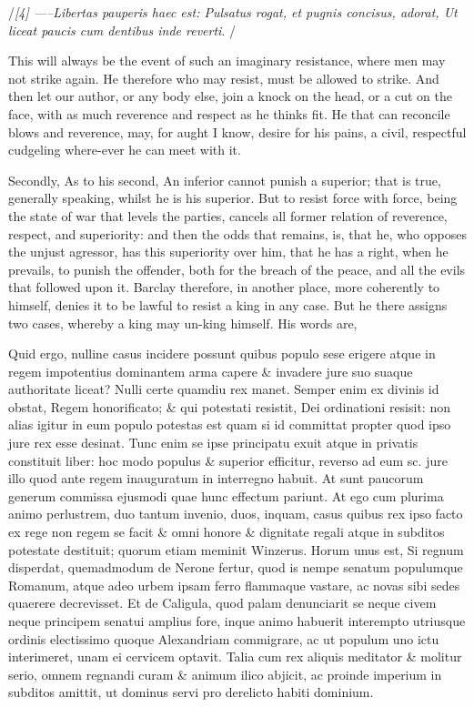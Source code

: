 \documentclass[11pt,openany]{book}
\begin{document}
/\emph{[4] -----Libertas pauperis haec est: Pulsatus rogat, et pugnis concisus, adorat, Ut liceat paucis cum dentibus inde reverti}. /

This will always be the event of such an imaginary resistance, where men may not strike again. He therefore who may resist, must be allowed to strike. And then let our author, or any body else, join a knock on the head, or a cut on the face, with as much reverence and respect as he thinks fit. He that can reconcile blows and reverence, may, for aught I know, desire for his pains, a civil, respectful cudgeling where-ever he can meet with it.

Secondly, As to his second, An inferior cannot punish a superior; that is true, generally speaking, whilst he is his superior. But to resist force with force, being the state of war that levels the parties, cancels all former relation of reverence, respect, and superiority: and then the odds that remains, is, that he, who opposes the unjust agressor, has this superiority over him, that he has a right, when he prevails, to punish the offender, both for the breach of the peace, and all the evils that followed upon it. Barclay therefore, in another place, more coherently to himself, denies it to be lawful to resist a king in any case. But he there assigns two cases, whereby a king may un-king himself. His words are,

Quid ergo, nulline casus incidere possunt quibus populo sese erigere atque in regem impotentius dominantem arma capere \& invadere jure suo suaque authoritate liceat? Nulli certe quamdiu rex manet. Semper enim ex divinis id obstat, Regem honorificato; \& qui potestati resistit, Dei ordinationi resisit: non alias igitur in eum populo potestas est quam si id committat propter quod ipso jure rex esse desinat. Tunc enim se ipse principatu exuit atque in privatis constituit liber: hoc modo populus \& superior efficitur, reverso ad eum sc. jure illo quod ante regem inauguratum in interregno habuit. At sunt paucorum generum commissa ejusmodi quae hunc effectum pariunt. At ego cum plurima animo perlustrem, duo tantum invenio, duos, inquam, casus quibus rex ipso facto ex rege non regem se facit \& omni honore \& dignitate regali atque in subditos potestate destituit; quorum etiam meminit Winzerus. Horum unus est, Si regnum disperdat, quemadmodum de Nerone fertur, quod is nempe senatum populumque Romanum, atque adeo urbem ipsam ferro flammaque vastare, ac novas sibi sedes quaerere decrevisset. Et de Caligula, quod palam denunciarit se neque civem neque principem senatui amplius fore, inque animo habuerit interempto utriusque ordinis electissimo quoque Alexandriam commigrare, ac ut populum uno ictu interimeret, unam ei cervicem optavit. Talia cum rex aliquis meditator \& molitur serio, omnem regnandi curam \& animum ilico abjicit, ac proinde imperium in subditos amittit, ut dominus servi pro derelicto habiti dominium.
\end{document}
